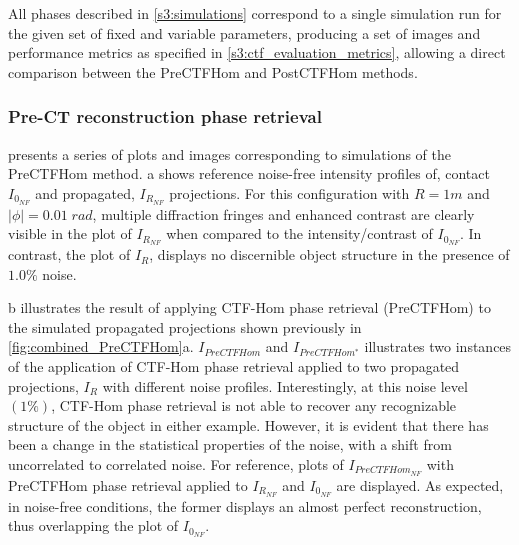 \documentclass[twocolumn, switch]{article} %
\begin{document}
All phases described in \cref{s3:simulations} correspond to a single simulation run for the given set of fixed and variable parameters, producing a set of images and performance metrics as specified in \cref{s3:ctf_evaluation_metrics}, allowing a direct comparison between the PreCTFHom and PostCTFHom methods.

\subsubsection{Pre-CT reconstruction phase retrieval}\label{s3:PreCTFHom}

 presents a series of plots and images corresponding to simulations of the PreCTFHom method. a shows reference noise-free intensity profiles of, contact $I_{{0_{{NF}}}}$ and propagated, $I_{{R_{{NF}}}}$ projections. For this configuration with $R=1m$ and $|\phi|=0.01\;rad$, multiple diffraction fringes and enhanced contrast are clearly visible in the plot of $I_{{R_{{NF}}}}$ when compared to the intensity/contrast of $I_{{0_{{NF}}}}$.  In contrast, the plot of $I_R$, displays no discernible object structure in the presence of $1.0\%$ noise.  

b illustrates the result of applying CTF-Hom phase retrieval (PreCTFHom) to the simulated propagated projections shown previously in \cref{fig:combined_PreCTFHom}a.  $I_{PreCTFHom}$ and $I_{PreCTFHom^{*}}$ illustrates two instances of the application of CTF-Hom phase retrieval applied to two propagated projections, $I_R$ with different noise profiles. Interestingly, at this noise level $(1\%)$, CTF-Hom phase retrieval is not able to recover any recognizable structure of the object in either example. However, it is evident that there has been a change in the statistical properties of the noise, with a shift from uncorrelated to correlated noise. For reference, plots of $I_{PreCTFHom_{NF}}$ with PreCTFHom phase retrieval applied to $I_{R_{NF}}$ and $I_{0_{NF}}$ are displayed. As expected, in noise-free conditions, the former displays an almost perfect reconstruction, thus overlapping the plot of  $I_{0_{NF}}$.
\end{document}
